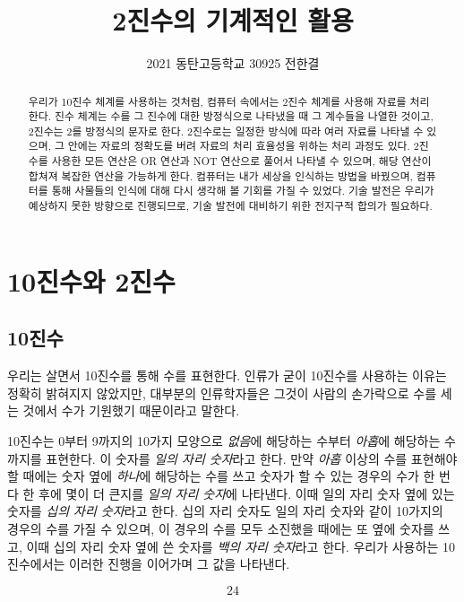 \documentclass{article}
\title{2진수의 기계적인 활용}
\author{2021 동탄고등학교 30925 전한결}
\begin{document}
    
\maketitle
\pagebreak
\tableofcontents
\pagebreak

\begin{abstract}
    우리가 10진수 체계를 사용하는 것처럼, 컴퓨터 속에서는 2진수 체계를 사용해 자료를 처리한다.
    진수 체계는 수를 그 진수에 대한 방정식으로 나타냈을 때 그 계수들을 나열한 것이고, 2진수는
    2를 방정식의 문자로 한다.
    2진수로는 일정한 방식에 따라 여러 자료를 나타낼 수 있으며, 그 안에는 자료의 정확도를 버려
    자료의 처리 효율성을 위하는 처리 과정도 있다.
    2진수를 사용한 모든 연산은 OR 연산과 NOT 연산으로 풀어서
    나타낼 수 있으며, 해당 연산이 합쳐져 복잡한 연산을 가능하게 한다.
    컴퓨터는 내가 세상을 인식하는 방법을 바꿨으며, 컴퓨터를 통해 사물들의 인식에 대해
    다시 생각해 볼 기회를 가질 수 있었다.
    기술 발전은 우리가 예상하지 못한 방향으로 진행되므로, 기술 발전에 대비하기 위한 전지구적 합의가
    필요하다.
\end{abstract}

\section{10진수와 2진수}

\subsection{10진수}

우리는 살면서 10진수를 통해 수를 표현한다.
인류가 굳이 10진수를 사용하는 이유는 정확히 밝혀지지 않았지만,
대부분의 인류학자들은 그것이 사람의 손가락으로 수를 세는 것에서
수가 기원했기 때문이라고 말한다.

10진수는 0부터 9까지의 10가지 모양으로 \textit{없음}에 해당하는 수부터 \textit{아홉}에 해당하는
수까지를 표현한다. 이 숫자를 \textit{일의 자리 숫자}라고 한다.
만약 \textit{아홉} 이상의 수를 표현해야 할 때에는 숫자 옆에 \textit{하나}에
해당하는 수를 쓰고 숫자가 할 수 있는 경우의 수가 한 번 다 한 후에 몇이 더 큰지를
\textit{일의 자리 숫자}에 나타낸다.
이때 일의 자리 숫자 옆에 있는 숫자를 \textit{십의 자리 숫자}라고 한다.
십의 자리 숫자도 일의 자리 숫자와 같이 10가지의 경우의 수를 가질 수 있으며,
이 경우의 수를 모두 소진했을 때에는 또 옆에 숫자를 쓰고,
이때 십의 자리 숫자 옆에 쓴 숫자를 \textit{백의 자리 숫자}라고 한다.
우리가 사용하는 10진수에서는 이러한 진행을 이어가며 그 값을 나타낸다.

$$
24
$$
\end{document}
